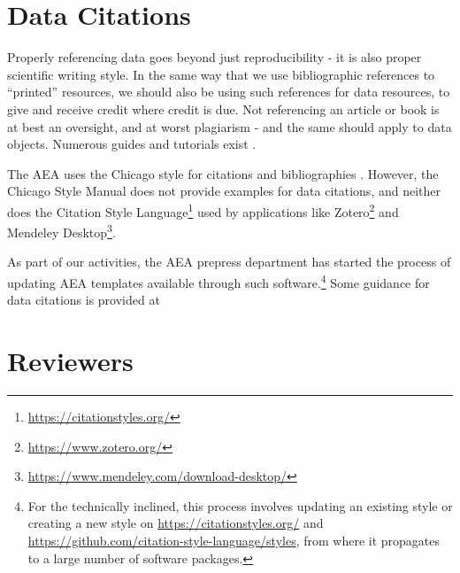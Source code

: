 \documentclass[AEJ]{AEA}
\begin{document}
\section{Data Citations}
Properly referencing data goes beyond just reproducibility - it is also proper scientific writing style. In the same way that we use bibliographic references to ``printed'' resources, we should also be using such references for data resources, to give and receive credit where credit is due. Not referencing an article or book is at best an oversight, and at worst plagiarism - and the same should apply to data objects. Numerous guides and tutorials exist  \citep{dataone-l09,icpsr-data-cite,force11declaration}.

The AEA uses the Chicago style for citations and bibliographies \citep{aeadatarefs}. However, the Chicago Style Manual \citep{citation-machine,ChicagoManualofStyleChicagoManualStyle2018} does not provide examples for data citations, and neither does the Citation Style Language\footnote{\url{https://citationstyles.org/}} used by applications like Zotero\footnote{\url{https://www.zotero.org/}} and Mendeley Desktop\footnote{\url{https://www.mendeley.com/download-desktop/}}.


As part of our activities, the AEA prepress department has started the process of updating AEA templates available through such software.\footnote{For the technically inclined, this process involves updating an existing style or creating a new style on \url{https://citationstyles.org/} and \url{https://github.com/citation-style-language/styles}, from where it propagates to a large number of software packages.} Some guidance for data citations is provided at 

\section{Reviewers}





\appendix
\end{document}
